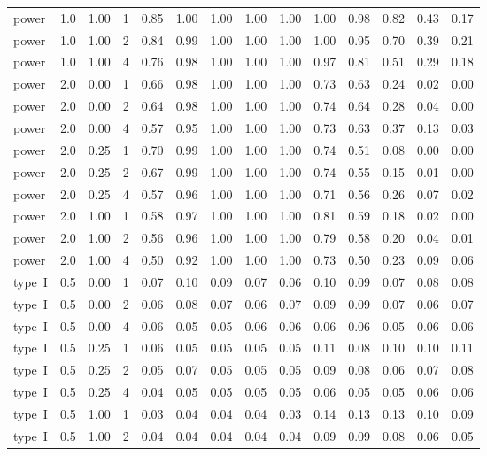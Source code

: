 \begin{table}[H]
\begin{tabular}{lrrrrrrrrrrrrr}
power & 1.0 & 1.00 & 1 & 0.85 & 1.00 & 1.00 & 1.00 & 1.00 & 1.00 & 0.98 & 0.82 & 0.43 & 0.17\\
power & 1.0 & 1.00 & 2 & 0.84 & 0.99 & 1.00 & 1.00 & 1.00 & 1.00 & 0.95 & 0.70 & 0.39 & 0.21\\
power & 1.0 & 1.00 & 4 & 0.76 & 0.98 & 1.00 & 1.00 & 1.00 & 0.97 & 0.81 & 0.51 & 0.29 & 0.18\\
power & 2.0 & 0.00 & 1 & 0.66 & 0.98 & 1.00 & 1.00 & 1.00 & 0.73 & 0.63 & 0.24 & 0.02 & 0.00\\
power & 2.0 & 0.00 & 2 & 0.64 & 0.98 & 1.00 & 1.00 & 1.00 & 0.74 & 0.64 & 0.28 & 0.04 & 0.00\\
power & 2.0 & 0.00 & 4 & 0.57 & 0.95 & 1.00 & 1.00 & 1.00 & 0.73 & 0.63 & 0.37 & 0.13 & 0.03\\
power & 2.0 & 0.25 & 1 & 0.70 & 0.99 & 1.00 & 1.00 & 1.00 & 0.74 & 0.51 & 0.08 & 0.00 & 0.00\\
power & 2.0 & 0.25 & 2 & 0.67 & 0.99 & 1.00 & 1.00 & 1.00 & 0.74 & 0.55 & 0.15 & 0.01 & 0.00\\
power & 2.0 & 0.25 & 4 & 0.57 & 0.96 & 1.00 & 1.00 & 1.00 & 0.71 & 0.56 & 0.26 & 0.07 & 0.02\\
power & 2.0 & 1.00 & 1 & 0.58 & 0.97 & 1.00 & 1.00 & 1.00 & 0.81 & 0.59 & 0.18 & 0.02 & 0.00\\
power & 2.0 & 1.00 & 2 & 0.56 & 0.96 & 1.00 & 1.00 & 1.00 & 0.79 & 0.58 & 0.20 & 0.04 & 0.01\\
power & 2.0 & 1.00 & 4 & 0.50 & 0.92 & 1.00 & 1.00 & 1.00 & 0.73 & 0.50 & 0.23 & 0.09 & 0.06\\
type~I & 0.5 & 0.00 & 1 & 0.07 & 0.10 & 0.09 & 0.07 & 0.06 & 0.10 & 0.09 & 0.07 & 0.08 & 0.08\\
type~I & 0.5 & 0.00 & 2 & 0.06 & 0.08 & 0.07 & 0.06 & 0.07 & 0.09 & 0.09 & 0.07 & 0.06 & 0.07\\
type~I & 0.5 & 0.00 & 4 & 0.06 & 0.05 & 0.05 & 0.06 & 0.06 & 0.06 & 0.06 & 0.05 & 0.06 & 0.06\\
type~I & 0.5 & 0.25 & 1 & 0.06 & 0.05 & 0.05 & 0.05 & 0.05 & 0.11 & 0.08 & 0.10 & 0.10 & 0.11\\
type~I & 0.5 & 0.25 & 2 & 0.05 & 0.07 & 0.05 & 0.05 & 0.05 & 0.09 & 0.08 & 0.06 & 0.07 & 0.08\\
type~I & 0.5 & 0.25 & 4 & 0.04 & 0.05 & 0.05 & 0.05 & 0.05 & 0.06 & 0.05 & 0.05 & 0.06 & 0.06\\
type~I & 0.5 & 1.00 & 1 & 0.03 & 0.04 & 0.04 & 0.04 & 0.03 & 0.14 & 0.13 & 0.13 & 0.10 & 0.09\\
type~I & 0.5 & 1.00 & 2 & 0.04 & 0.04 & 0.04 & 0.04 & 0.04 & 0.09 & 0.09 & 0.08 & 0.06 & 0.05\\

\end{tabular}
\end{table}
